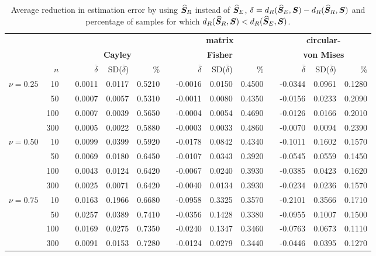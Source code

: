 \begin{table}[h!]
\caption{Average reduction in estimation error by using ${\widehat{\bm S}_R}$ instead of ${\widehat{\bm S}_E}$, $\delta={d_R}({\widehat{\bm S}_E},\bm S) - {d_R}({\widehat{\bm S}_R},\bm S)$ and percentage of samples for which ${d_R}({\widehat{\bm S}_R},\bm S) < {d_R}({\widehat{\bm S}_E},\bm S)$.  \label{tab:percL2}}
\begin{center}
\begin{tabular}{rrcrrrcrrrcrrr}
  \hline
  & &&\multicolumn{3}{c}{} & &\multicolumn{3}{c}{\textbf{matrix} } &&\multicolumn{3}{c}{\textbf{circular-}}\\
    && &\multicolumn{3}{c}{\textbf{Cayley}} & &\multicolumn{3}{c}{\textbf{Fisher}} & &\multicolumn{3}{c}{\textbf{von Mises}}\\ 
\rule[2mm]{0mm}{3mm} 
  &  $n$ && $\bar{\delta}$&SD($\bar\delta$) & \% & & $\bar{\delta}$&SD($\bar\delta$) & \% & & $\bar{\delta}$&SD($\bar\delta$) & \% \\  
  \hline \hline
\multirow{4}{*}{$\nu=0.25$}
 &    10 && 0.0011 & 0.0117 & 0.5210 && -0.0016 & 0.0150 & 0.4500 && -0.0344 & 0.0961 & 0.1280 \\ 
 &    50 && 0.0007 & 0.0057 & 0.5310 && -0.0011 & 0.0080 & 0.4350 && -0.0156 & 0.0233 & 0.2090 \\ 
 &   100 && 0.0007 & 0.0039 & 0.5650 && -0.0004 & 0.0054 & 0.4690 && -0.0126 & 0.0166 & 0.2010 \\ 
 &   300 && 0.0005 & 0.0022 & 0.5880 && -0.0003 & 0.0033 & 0.4860 && -0.0070 & 0.0094 & 0.2390 \\\hline
  \multirow{4}{*}{$\nu=0.50$}
  &    10 && 0.0099 & 0.0399 & 0.5920 && -0.0178 & 0.0842 & 0.4340 && -0.1011 & 0.1602 & 0.1570 \\ 
  &    50 && 0.0069 & 0.0180 & 0.6450 && -0.0107 & 0.0343 & 0.3920 && -0.0545 & 0.0559 & 0.1450 \\ 
  &   100 && 0.0043 & 0.0124 & 0.6420 && -0.0067 & 0.0240 & 0.3930 && -0.0385 & 0.0423 & 0.1620 \\ 
  &   300 && 0.0025 & 0.0071 & 0.6420 && -0.0040 & 0.0134 & 0.3930 && -0.0234 & 0.0236 & 0.1570 \\ \hline
  \multirow{4}{*}{$\nu=0.75$}
  &    10 && 0.0163 & 0.1966 & 0.6680 && -0.0958 & 0.3325 & 0.3570 && -0.2101 & 0.3566 & 0.1710 \\ 
  &    50 && 0.0257 & 0.0389 & 0.7410 && -0.0356 & 0.1428 & 0.3380 && -0.0955 & 0.1007 & 0.1500 \\ 
  &   100 && 0.0169 & 0.0275 & 0.7350 && -0.0240 & 0.1347 & 0.3460 && -0.0763 & 0.0673 & 0.1110 \\ 
  &   300 && 0.0091 & 0.0153 & 0.7280 && -0.0124 & 0.0279 & 0.3440 && -0.0446 & 0.0395 & 0.1270 \\
   \hline
\end{tabular}
\end{center}
\end{table}
